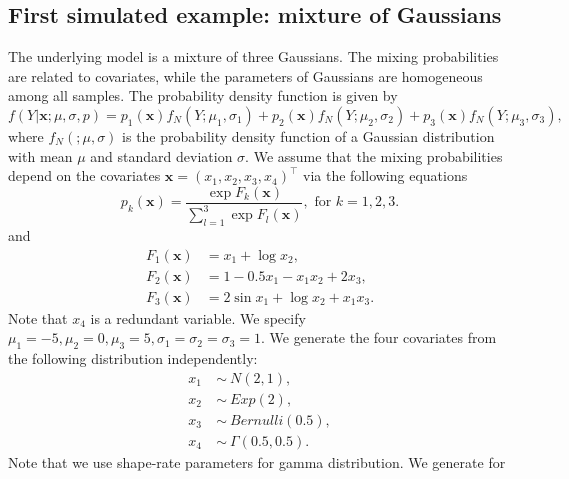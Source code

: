 \documentclass[11pt]{article}
\numberwithin{equation}{section}
\def\bx{\boldsymbol{x}}
\begin{document}
\subsection{First simulated example: mixture of Gaussians}

The underlying model is a mixture of three Gaussians. The mixing probabilities are related to covariates, while the parameters of Gaussians are homogeneous among all samples.
The probability density function is given by
\begin{equation}
f(Y|\bx; \mu,\sigma,p)=p_1(\bx)f_N(Y;\mu_1,\sigma_1)+p_2(\bx)f_N(Y;\mu_2,\sigma_2)+p_3(\bx)f_N(Y;\mu_3,\sigma_3),
\end{equation}
where $f_N(;\mu,\sigma)$ is the probability density function of a Gaussian distribution with mean $\mu$ and standard deviation $\sigma$.
We assume that the mixing probabilities depend on the covariates $\bx=(x_1,x_2,x_3,x_4)^\top$ via the following equations
\begin{equation}\label{logistic}
	p_k(\bx)=\frac{\exp{F_k(\bx)}}{\sum_{l=1}^{3}\exp{F_l(\bx)}}, \text{ for } k=1,2,3.
\end{equation}
and 
\begin{align*}
F_1(\bx)&=x_1+\log x_2,\\
 F_2(\bx)&=1-0.5x_1-x_1x_2+2x_3, \\
  F_3(\bx)&=2\sin x_1+\log x_2 + x_1x_3.
	\end{align*}
Note that $x_4$ is a redundant variable. We specify $\mu_1=-5,\mu_2=0,\mu_3=5, \sigma_1=\sigma_2=\sigma_3=1$. We generate the four covariates from the following distribution independently:
   \begin{align*}
   	x_1~&\sim~ N(2,1),\\
   	x_2~&\sim~ Exp(2), \\
   	x_3~&\sim~ Bernulli(0.5), \\
   	x_4~&\sim~ \Gamma(0.5,0.5).
   \end{align*}
Note that we use shape-rate parameters for gamma distribution.
We generate for 
\end{document}

